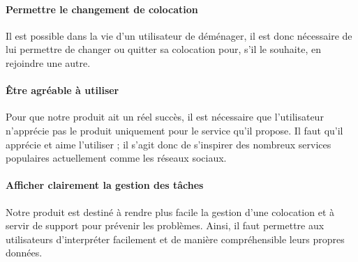 \paragraph{Permettre le changement de colocation\\}
Il est possible dans la vie d'un utilisateur de déménager, il est donc nécessaire de lui permettre de changer ou quitter sa colocation pour, s'il le souhaite, en rejoindre une autre.

\paragraph{Être agréable à utiliser\\}
Pour que notre produit ait un réel succès, il est nécessaire que l'utilisateur n'apprécie pas le produit uniquement pour le service  qu'il propose. Il faut qu'il apprécie et aime l'utiliser ; il s'agit donc de s'inspirer des nombreux services populaires actuellement comme les réseaux sociaux.

\paragraph{Afficher clairement la gestion des tâches\\}
Notre produit est destiné à rendre plus facile la gestion d'une colocation et à servir de support pour prévenir les problèmes. Ainsi, il faut permettre aux utilisateurs d'interpréter facilement et de manière compréhensible leurs propres données.